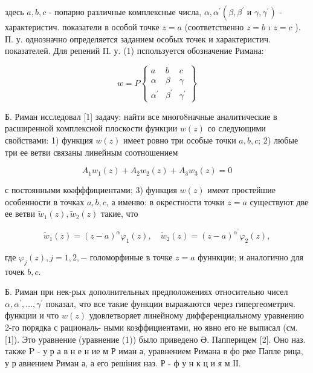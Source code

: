 \documentclass[10pt]{article}
\begin{document}
здесь $a, b, c$ - попарно различные комплексные числа, $\alpha, \alpha^{\prime}\left(\beta, \beta^{\prime}\right.$ и $\left.\gamma, \gamma^{\prime}\right)$ - характеристич. показатели в особой точке $z=a$ (соответственно $z=b$ ı $z=c$ ). П. у. однозначно определяется заданием особых точек и характеристич. показателей. Для репений П. у. (1) пспользуется обозначение Римана:



\[

w=P\left\{\begin{array}{lll}

a & b & c \\

\alpha & \beta & \gamma \\

\alpha^{\prime} & \beta^{\prime} & \gamma^{\prime}

\end{array}\right\}

\]



Б. Риман исследовал [1] задачу: найти все много8начные аналитические в расширенной комплексной плоскости функции $w(z)$ со следующими свойствами: 1) функция $w(z)$ имеет ровно три особые точки $a, b, c$; 2) любые три ее ветви связаны линейным соотношением



\[

A_{1} w_{1}(z)+A_{2} w_{2}(z)+A_{3} w_{3}(z)=0

\]



с постоянными коәфффициентами; 3) функция $w(z)$ имеөт простейшие особенности в точках $a, b, c$, а именво: в окрестности точки $z=a$ существуют две ее ветви $\tilde{w}_{1}(z), \tilde{w}_{2}(z)$ такие, что



\[

\tilde{w}_{1}(z)=(z-a)^{\alpha} \varphi_{1}(z), \quad \tilde{w}_{2}(z)=(z-a)^{\alpha^{\prime}} \varphi_{2}(z),

\]



где $\varphi_{j}(z), j=1,2,-$ голоморфиные в точке $z=a$ фуннкции; и аналогично для точек $b, c$.



Б. Риман при нек-рых дополнительных предположениях относительно чисел $\alpha, \alpha^{\prime}, \ldots, \gamma^{\prime}$ показал, что все такие функции выражаются через гипергеометрич. функции и что $w(z)$ удовлетворяет линейному дифференциальному уравнению 2-го порядка с рациональ- ными козффициентами, но явно его не выписал (см. [1]). Это уравнение (уравнение (1)) было приведено Ə. Папперицем [2]. Оно наз. также $\mathrm{P}$ - у р а в н е н ие м Р иман а, уравнением Римана в фо рме Папле рица, у р авнением Риман а, а его решіния наз. Р - ф у н к ц и я м ІІ.
\end{document}
